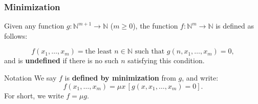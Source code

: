 \documentclass{beamer}
\begin{document}



\begin{frame}
  \frametitle{Minimization}

  \begin{definition}
    Given any function \( g: \mathbb{N}^{m+1} \to \mathbb{N} \) (\( m \geq 0 \)), the function \( f: \mathbb{N}^m \to \mathbb{N} \) is defined as follows:

    \[
      f(x_1, \dots, x_m) = \text{the least } n \in \mathbb{N} \text{ such that } g(n, x_1, \dots, x_m) = 0,
    \]
    and is \textbf{undefined} if there is no such \( n \) satisfying this condition.
  \end{definition}

  \begin{block}{Notation}
    We say \( f \) is \textbf{defined by minimization} from \( g \), and write:
    \[
      f(x_1, \dots, x_m) = \mu x \, [g(x, x_1, \dots, x_m) = 0].
    \]
    For short, we write \( f = \mu g \).
  \end{block}

\end{frame}
\end{document}
